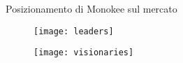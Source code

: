 \begin{tframe}{Posizionamento di Monokee sul mercato}
\begin{center}
\end{center}
\begin{minipage}{0.5\textwidth}
\begin{figure}[h]
\centering
\texttt{[image: leaders]}
\end{figure}
\end{minipage}
\begin{minipage}{0.45\textwidth}
\begin{figure}[h]
\centering
\texttt{[image: visionaries]}
\end{figure}
\end{minipage}
\end{tframe}